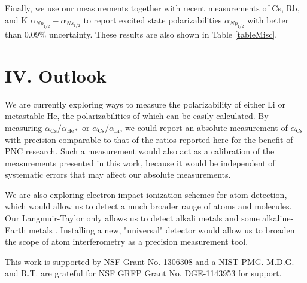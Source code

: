 \documentclass[twocolumn,prl,showpacs,superscriptaddress]{revtex4-1}   %
\newcommand{\acs}{\alpha_{\textrm{Cs}}}
\begin{document}
Finally, we use our measurements together with recent measurements of Cs, Rb, and K $\alpha_{Np_{1/2}} - \alpha_{Ns_{1/2}}$ \cite{Hunter1991,Miller1994} to report excited state polarizabilities $\alpha_{Np_{1/2}}$ with better than 0.09\% uncertainty. 
These results are also shown in Table \ref{tableMisc}.

\section{IV. Outlook}

We are currently exploring ways to measure the polarizability of either Li or metastable He, the polarizabilities of which can be easily calculated. By measuring $\acs/\alpha_{\mathrm{He*}}$ or $\acs/\alpha_{\mathrm{Li}}$, we could report an absolute measurement of $\acs$ with precision comparable to that of the ratios reported here for the benefit of PNC research. Such a measurement would also act as a calibration of the measurements presented in this work, because it would be independent of systematic errors that may affect our absolute measurements.

We are also exploring electron-impact ionization schemes for atom detection, which would allow us to detect a much broader range of atoms and molecules. Our Langmuir-Taylor only allows us to detect alkali metals and some alkaline-Earth metals \cite{Delhuille2002}. Installing a new, "universal" detector would allow us to broaden the scope of atom interferometry as a precision measurement tool. 

This work is supported by NSF Grant No. 1306308 and a NIST PMG. M.D.G. and R.T. are grateful for NSF GRFP Grant No. DGE-1143953 for support. 


%

\end{document}
